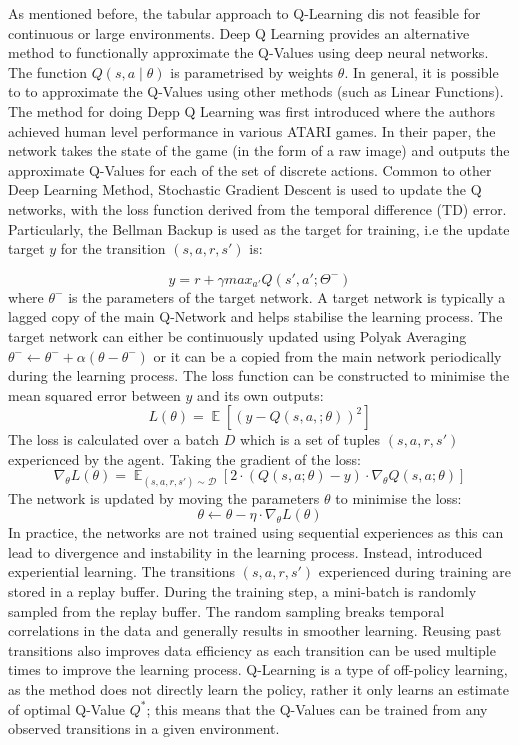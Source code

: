 \documentclass[12pt,a4paper]{report}
\DeclareMathOperator{\EX}{\mathbb{E}}
\begin{document}
As mentioned before, the tabular approach to Q-Learning dis not feasible for continuous or large environments. Deep Q Learning provides an alternative method to functionally approximate the Q-Values using deep neural networks. The function $Q(s, a \mid \theta)$ is parametrised by weights $\theta$. In general, it is possible to to approximate the Q-Values using other methods (such as Linear Functions).
The method for doing Depp Q Learning was first introduced \cite{Mnih2015} where the authors achieved human level performance in various ATARI games. In their paper, the network takes the state of the game (in the form of a raw image) and outputs the approximate Q-Values for each of the set of discrete actions. Common to other Deep Learning Method, Stochastic Gradient Descent is used to update the Q networks, with the loss function derived from the temporal difference (TD) error. Particularly, the Bellman Backup is used as the target for training, i.e the update target $y$ for the transition $(s, a, r, s')$ is: 

\[
  y = r + \gamma max_{a'} Q(s', a'; \Theta^-)
\]
where $\theta^-$ is the parameters of the target network. A target network is typically a lagged copy of the main Q-Network and helps stabilise the learning process. The target network can either be continuously updated using Polyak Averaging $\theta^- \leftarrow \theta^-+ \alpha (\theta - \theta^-)$ or it can be a copied from the main network periodically during the learning process. 
The loss function can be constructed to minimise the mean squared error between $y$ and its own outputs: 
\[
  L(\theta) = \EX[(y - Q(s, a, ; \theta))^2]
\] 
The loss is calculated over a batch $D$ which is a set of tuples $(s, a, r, s')$ expericnced by the agent. Taking the gradient of the loss:
\[
\nabla_{\theta} L(\theta) = \EX_{(s, a, r, s') \sim \mathcal{D}} [ 2 \cdot \left( Q(s, a; \theta) - y \right) \cdot \nabla_{\theta} Q(s, a; \theta) ]
\]
The network is updated by moving the parameters $\theta$ to minimise the loss:
\[
  \theta \leftarrow \theta - \eta \cdot \nabla_{\theta} L(\theta)
\] 
In practice, the networks are not trained using sequential experiences as this can lead to divergence and instability in the learning process. Instead, \cite{Mnih2015} introduced experiential learning. The transitions $(s, a, r, s')$ experienced during training are stored in a replay buffer. During the training step, a mini-batch is randomly sampled from the replay buffer. The random sampling breaks temporal correlations in the data and generally results in smoother learning. Reusing past transitions also improves data efficiency as each transition can be used multiple times to improve the learning process. Q-Learning is a type of off-policy learning, as the method does not directly learn the policy, rather it only learns an estimate of optimal Q-Value $Q^*$; this means that the Q-Values can be trained from any observed transitions in a given environment. 
\end{document}
